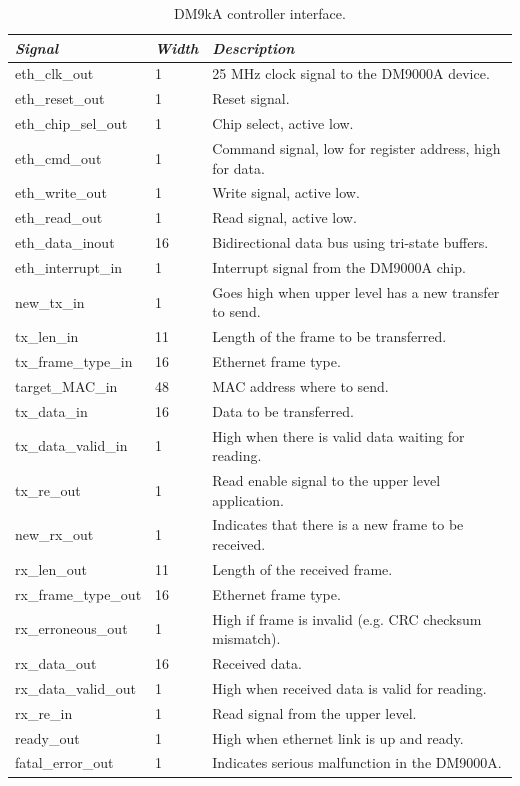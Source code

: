 \documentclass{article}
\begin{document}
\begin{table}[htb]
  \begin{tabular}{|l|l|l|}
    \hline
    \textit{Signal} & \textit{Width} & \textit{Description} \\
    \hline
    eth\_clk\_out & 1 & 25 MHz clock signal to the DM9000A device. \\
    eth\_reset\_out & 1 & Reset signal. \\
    eth\_chip\_sel\_out & 1 & Chip select, active low. \\
    eth\_cmd\_out & 1 & Command signal, low for register address, high for data. \\
    eth\_write\_out & 1 & Write signal, active low. \\
    eth\_read\_out & 1 & Read signal, active low. \\
    eth\_data\_inout & 16 & Bidirectional data bus using tri-state buffers. \\
    eth\_interrupt\_in & 1 & Interrupt signal from the DM9000A chip. \\
    \hline
    new\_tx\_in & 1 & Goes high when upper level has a new transfer to send. \\
    tx\_len\_in & 11 & Length of the frame to be transferred. \\
    tx\_frame\_type\_in & 16 & Ethernet frame type. \\
    target\_MAC\_in & 48 & MAC address where to send. \\
    tx\_data\_in & 16 & Data to be transferred. \\
    tx\_data\_valid\_in & 1 & High when there is valid data waiting for reading. \\
    tx\_re\_out & 1 & Read enable signal to the upper level application. \\
    new\_rx\_out & 1 & Indicates that there is a new frame to be received. \\
    rx\_len\_out & 11 & Length of the received frame. \\
    rx\_frame\_type\_out & 16 & Ethernet frame type. \\
    rx\_erroneous\_out & 1 & High if frame is invalid (e.g. CRC checksum mismatch). \\
    rx\_data\_out & 16 & Received data. \\
    rx\_data\_valid\_out & 1 & High when received data is valid for reading. \\
    rx\_re\_in & 1 & Read signal from the upper level. \\
    \hline
    ready\_out & 1 & High when ethernet link is up and ready. \\
    fatal\_error\_out & 1 & Indicates serious malfunction in the DM9000A. \\
    \hline
  \end{tabular}
  \caption{DM9kA controller interface.}
  \label{tab:interface}
\end{table}
\end{document}
